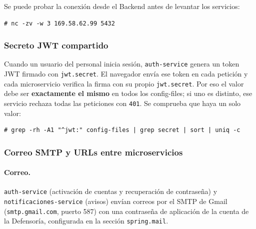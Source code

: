 Se puede probar la conexión desde el Backend antes de levantar los servicios:
\begin{lstlisting}
# nc -zv -w 3 169.58.62.99 5432
\end{lstlisting}

\subsubsection{Secreto JWT compartido}
Cuando un usuario del personal inicia sesión, \texttt{auth-service} genera un token JWT firmado con \texttt{jwt.secret}. El navegador envía ese token en cada petición y cada microservicio verifica la firma con su propio \texttt{jwt.secret}. Por eso el valor debe ser \textbf{exactamente el mismo} en todos los config-files; si uno es distinto, ese servicio rechaza todas las peticiones con \texttt{401}. Se comprueba que haya un solo valor:
\begin{lstlisting}
# grep -rh -A1 "^jwt:" config-files | grep secret | sort | uniq -c
\end{lstlisting}

\subsubsection{Correo SMTP y URLs entre microservicios}
\paragraph{Correo.} \texttt{auth-service} (activación de cuentas y recuperación de contraseña) y \texttt{notificaciones-service} (avisos) envían correos por el SMTP de Gmail (\texttt{smtp.gmail.com}, puerto 587) con una contraseña de aplicación de la cuenta de la Defensoría, configurada en la sección \texttt{spring.mail}.

